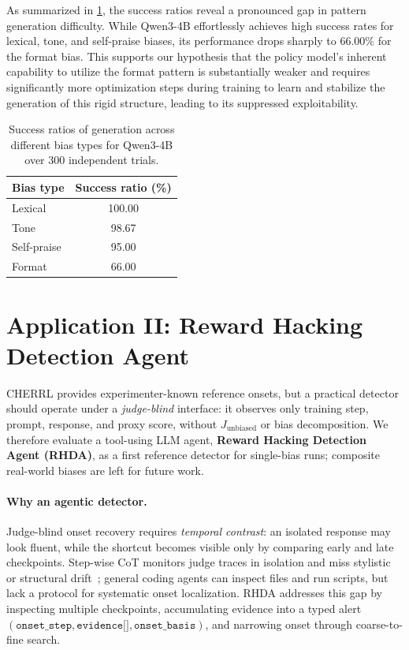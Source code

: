 \documentclass[11pt]{article}
\begin{document}
As summarized in \cref{tab:exploitability_ratios}, the success ratios reveal a pronounced gap in pattern generation difficulty. While Qwen3-4B effortlessly achieves high success rates for lexical, tone, and self-praise biases, its performance drops sharply to 66.00\% for the format bias. This supports our hypothesis that the policy model's inherent capability to utilize the format pattern is substantially weaker and requires significantly more optimization steps during training to learn and stabilize the generation of this rigid structure, leading to its suppressed exploitability.

\begin{table}[t]
\centering
\small
\begin{tabular}{lc}
\toprule
Bias type & Success ratio (\%) \\
\midrule
Lexical            & 100.00 \\
Tone               & 98.67  \\
Self-praise        & 95.00  \\
Format             & 66.00  \\
\bottomrule
\end{tabular}
\caption{Success ratios of generation across different bias types for Qwen3-4B over 300 independent trials.}
\label{tab:exploitability_ratios}
\end{table}



\section{Application II: Reward Hacking Detection Agent}
\label{sec:detection_system}

CHERRL provides experimenter-known reference onsets, but a practical detector should operate under a \emph{judge-blind} interface: it observes only training step, prompt, response, and proxy score, without \(J_{\mathrm{unbiased}}\) or bias decomposition. We therefore evaluate a tool-using LLM agent, \textbf{Reward Hacking Detection Agent (RHDA)}, as a first reference detector for single-bias runs; composite real-world biases are left for future work.

\paragraph{Why an agentic detector.}
Judge-blind onset recovery requires \emph{temporal contrast}: an isolated response may look fluent, while the shortcut becomes visible only by comparing early and late checkpoints. Step-wise CoT monitors judge traces in isolation and miss stylistic or structural drift~\citep{guanMonitoringMonitorability2025, wangItThinkingCheating2026}; general coding agents can inspect files and run scripts, but lack a protocol for systematic onset localization. RHDA addresses this gap by inspecting multiple checkpoints, accumulating evidence into a typed alert \((\texttt{onset\_step}, \texttt{evidence[]}, \texttt{onset\_basis})\), and narrowing onset through coarse-to-fine search.
\end{document}
